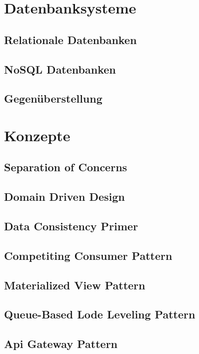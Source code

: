 \section{Datenbanksysteme}
	\subsection{Relationale Datenbanken}
	\subsection{NoSQL Datenbanken}
	\subsection{Gegenüberstellung}
	
\section{Konzepte}
	\subsection{Separation of Concerns}
	\subsection{Domain Driven Design}
	\subsection{Data Consistency Primer}
	\subsection{Competiting Consumer Pattern}
	\subsection{Materialized View Pattern}
	\subsection{Queue-Based Lode Leveling Pattern}
	\subsection{Api Gateway Pattern}
